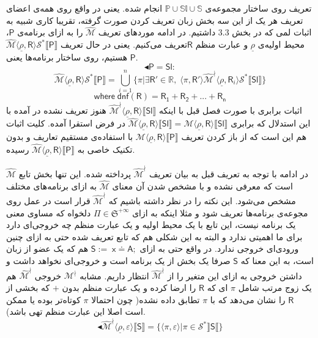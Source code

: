 تعریف روی ساختار مجموعه‌ی 
$\mathbb{P \cup Sl \cup S}$
انجام شده. یعنی در واقع روی همه‌ی اعضای تعریف هر یک از این سه بخش زبان تعریف کردن صورت گرفته، تقریبا کاری شبیه به اثبات لمی که در بخش 3.3 داشتیم.
در ادامه موردهای تعریف $\mathcal{\hat{M}}$ را به ازای برنامه‌ی $\mathsf{P}$، محیط اولیه‌ی $\underline{\rho}$ و عبارت منظم $\mathsf{R}$تعریف می‌کنیم. یعنی در حال تعریف 
$\mathcal{\hat{M}} \langle \underline{\rho} , \mathsf{R} \rangle \mathcal{S}^* 
\llbracket \mathsf{P} \rrbracket$
هستیم، روی ساختار برنامه‌ها یعنی $\mathsf{P}$.
$$\blacktriangleleft \mathsf{P=Sl:}$$
$$\mathcal{\hat{M}} \langle \underline{\rho} , \mathsf{R} \rangle \mathcal{S}^* \llbracket \mathsf{P} \rrbracket=
\bigcup_{i=1}^n \{\pi | \exists \mathsf{R'} \in \mathbb{R}, \; \langle \pi , \mathsf{R'} \rangle \mathcal{\hat{M}^\nmid}
\langle \underline{\rho}, \mathsf{R}_i \rangle \mathcal{S}^* \llbracket \mathsf{Sl} \rrbracket \}
$$  
$$\mathsf{where\; dnf(R)=R_1 + R_2 + ... + R_n}$$
اثبات برابری با صورت فصل قبل با اینکه 
$\mathcal{\hat{M}^\nmid} \langle \underline{\rho}, \mathsf{R} \rangle \llbracket \mathsf{Sl} \rrbracket$
هنوز تعریف نشده در \cite{calcul} آمده با این استدلال که برابری 
$\mathcal{\hat{M}} \langle \underline{\rho}, \mathsf{R} \rangle \llbracket \mathsf{Sl} \rrbracket=
\mathcal{{M}} \langle \underline{\rho}, \mathsf{R} \rangle \llbracket \mathsf{Sl} \rrbracket$
در فرض استقرا آمده. کلیت اثبات هم این است که از باز کردن تعریف
$\mathcal{{M}} \langle \underline{\rho}, \mathsf{R} \rangle \llbracket \mathsf{P} \rrbracket$
با استفاده‌ی مستقیم تعاریف و بدون تکنیک خاصی به 
$\mathcal{\hat{M}} \langle \underline{\rho}, \mathsf{R} \rangle \llbracket \mathsf{P} \rrbracket$
رسیده.

در ادامه با توجه به تعریف قبل به بیان تعریف 
$\mathcal{\hat{M}^\nmid}$
پرداخته شده. این تنها بخش تابع $\mathcal{\hat{M}}$ است که معرفی نشده و با مشخص شدن آن معنای 
$\mathcal{\hat{M}}$
به ازای برنامه‌های مختلف مشخص می‌شود. این نکته را در نظر داشته باشیم که 
$\mathcal{\hat{M}^\nmid}$
قرار است در عمل روی مجوعه‌ی برنامه‌ها تعریف شود و مثلا اینکه به ازای  
$\Pi \in \mathfrak{S}^{+\infty}$
دلخواه که مساوی معنی یک برنامه نیست، این تابع با یک محیط اولیه و یک عبارت منظم چه خروجی‌ای دارد برای ما اهمیتی ندارد و البته به این شکلی  هم که تابع تعریف شده حتی به ازای چنین ورودی‌ای خروجی ندارد. در واقع حتی به ازای 
$\mathsf{S:=\; x\doteq A;}$
هم که یک عضو از زبان است، به این معنا که $\mathsf{S}$ صرفا یک بخش از یک برنامه است و
 خروجی‌ای نخواهد داشت و داشتن خروجی به ازای این متغیر را از 
$\mathcal{\hat{M}^\nmid}$
انتظار داریم. مشابه 
$\mathcal{M^\nmid}$
خروجی 
$\mathcal{\hat{M}^\nmid}$
هم یک زوج مرتب شامل $\pi$ ای که $\mathsf{R}$ را ارضا کرده و یک عبارت منظم بدون $+$ که بخشی از $\mathsf{R}$ را نشان می‌دهد که با $\pi$ تطابق داده نشده( چون احتمالا $\pi$ کوتاه‌تر بوده یا ممکن است اصلا این عبارت منظم تهی باشد).
$$\blacktriangleleft\mathcal{\hat{M}^\nmid} \langle \underline{\rho}, \mathsf{\varepsilon} \rangle \llbracket \mathsf{S} \rrbracket
=
\{\langle \pi , \varepsilon \rangle | \pi \in \mathcal{S}^* \rrbracket \mathsf{S} \llbracket \}$$

